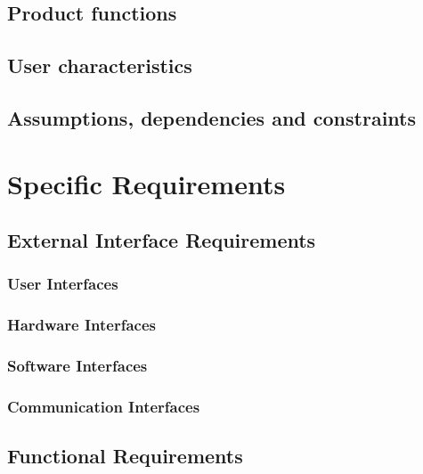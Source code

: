 \documentclass{/D:/Users/corsair-dragon/Documents/Github - Mario/CelaCelaCogollo/RASD/LaTeXCode/src/Configuration_Files/PoliMi3i_thesis.cls}
\begin{document}
    \section{Product functions}\label{sec:product_functions}


    \section{User characteristics}\label{sec:user_characteristics}


    \section{Assumptions, dependencies and constraints}\label{sec:assumptions_dependencies_and_constraints}


    \chapter{Specific Requirements}\label{ch:specific_requirements}


    \section{External Interface Requirements}\label{sec:external_interface_requirements}

    \subsection{User Interfaces}\label{subsec:user_interfaces}

    \subsection{Hardware Interfaces}\label{subsec:hardware_interfaces}

    \subsection{Software Interfaces}\label{subsec:software_interfaces}

    \subsection{Communication Interfaces}\label{subsec:communication_interfaces}


    \section{Functional Requirements}\label{sec:functional_requirements}
\end{document}
